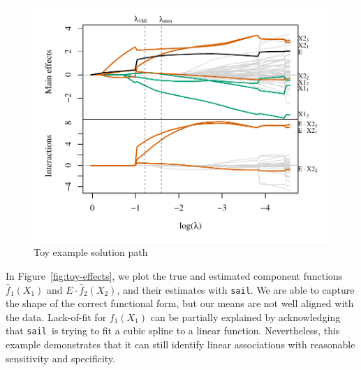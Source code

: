 \documentclass[12pt,letter]{article}\usepackage[]{graphicx}\usepackage[]{color}
\newenvironment{knitrout}{}{} %
\newcommand{\sail}{\texttt{sail}}
\begin{document}
\begin{knitrout}\scriptsize
{}\color{fgcolor}\begin{figure}[H]

{\centering \includegraphics[width=1\linewidth]{figure/toy-solution-path-1} 

}

\caption[Toy example solution path]{Toy example solution path}\label{fig:toy-solution-path}
\end{figure}


\end{knitrout}

In Figure~\ref{fig:toy-effects}, we plot the true and estimated component functions $\hat{f}_1(X_1)$ and $E \cdot \hat{f}_2(X_2)$, and their estimates with \texttt{sail}. We are able to capture the shape of the correct functional form, but our means are not well aligned with the data. Lack-of-fit for $f_1(X_1)$ can be partially explained by acknowledging that \sail ~is trying to fit a cubic spline to a linear function. Nevertheless, this example demonstrates that it can still identify linear associations with reasonable sensitivity and specificity. 
\end{document}
